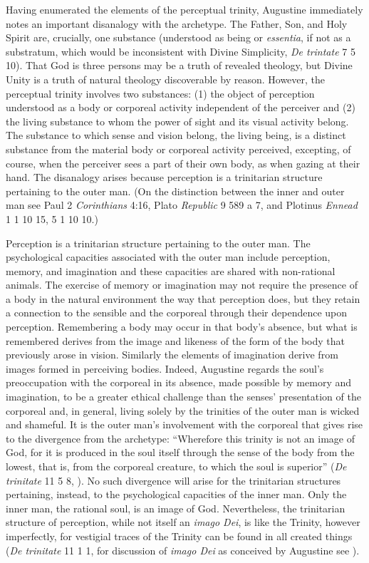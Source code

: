 \documentclass[12pt]{article}
\begin{document}
Having enumerated the elements of the perceptual trinity, Augustine immediately notes an important disanalogy with the archetype. The Father, Son, and Holy Spirit are, crucially, one substance (understood as being or \emph{essentia}, if not as a substratum, which would be inconsistent with Divine Simplicity, \emph{De trintate} 7 5 10). That God is three persons may be a truth of revealed theology, but Divine Unity is a truth of natural theology discoverable by reason. However, the perceptual trinity involves two substances: (1) the object of perception understood as a body or corporeal activity independent of the perceiver and (2) the living substance to whom the power of sight and its visual activity belong. The substance to which sense and vision belong, the living being, is a distinct substance from the material body or corporeal activity perceived, excepting, of course, when the perceiver sees a part of their own body, as when gazing at their hand. The disanalogy arises because perception is a trinitarian structure pertaining to the outer man. (On the distinction between the inner and outer man see Paul 2 \emph{Corinthians} 4:16, Plato \emph{Republic} 9 589 a 7, and Plotinus \emph{Ennead} 1 1 10 15, 5 1 10 10.) 

Perception is a trinitarian structure pertaining to the outer man. The psychological capacities associated with the outer man include perception, memory, and imagination and these capacities are shared with non-rational animals. The exercise of memory or imagination may not require the presence of a body in the natural environment the way that perception does, but they retain a connection to the sensible and the corporeal through their dependence upon perception. Remembering a body may occur in that body's absence, but what is remembered derives from the image and likeness of the form of the body that previously arose in vision. Similarly the elements of imagination derive from images formed in perceiving bodies. Indeed, Augustine regards the soul's preoccupation with the corporeal in its absence, made possible by memory and imagination, to be a greater ethical challenge than the senses' presentation of the corporeal and, in general, living solely by the trinities of the outer man is wicked and shameful. It is the outer man's involvement with the corporeal that gives rise to the divergence from the archetype: ``Wherefore this trinity is not an image of God, for it is produced in the soul itself through the sense of the body from the lowest, that is, from the corporeal creature, to which the soul is superior'' (\emph{De trinitate} 11 5 8, \citealt[70]{Matthews:2002ly}). No such divergence will arise for the trinitarian structures pertaining, instead, to the psychological capacities of the inner man. Only the inner man, the rational soul, is an image of God. Nevertheless, the trinitarian structure of perception, while not itself an \emph{imago Dei}, is like the Trinity, however imperfectly, for vestigial traces of the Trinity can be found in all created things (\emph{De trinitate} 11 1 1, for discussion of \emph{imago Dei} as conceived by Augustine see \citealt[chapter 11]{Gioia:2008zm}).
\end{document}
